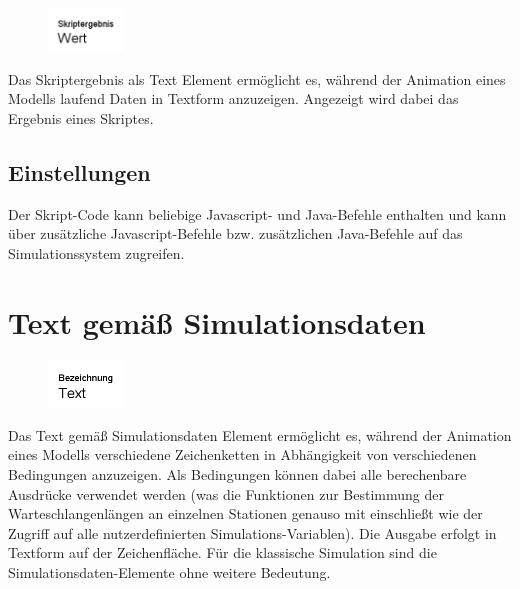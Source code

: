 \begin{figure}
\vspace{-22pt}
\includegraphics[width=2cm]{imageModelElementAnimationTextJS.png}
\vspace{-22pt}
\end{figure}

Das Skriptergebnis als Text Element ermöglicht es, während der Animation eines Modells laufend Daten in Textform anzuzeigen.
Angezeigt wird dabei das Ergebnis eines Skriptes.

\subsection*{Einstellungen}

Der Skript-Code kann beliebige Javascript- und Java-Befehle enthalten und kann über
zusätzliche Javascript-Befehle bzw. zusätzlichen Java-Befehle 
auf das Simulationssystem zugreifen.


\section{Text gemäß Simulationsdaten}
\label{ref:ModelElementAnimationTextSelect}

\begin{figure}
\vspace{-22pt}
\includegraphics[width=2cm]{imageModelElementAnimationTextSelect.png}
\vspace{-22pt}
\end{figure}

Das Text gemäß Simulationsdaten Element ermöglicht es, während der Animation eines Modells verschiedene
Zeichenketten in Abhängigkeit von verschiedenen Bedingungen anzuzeigen. Als Bedingungen können dabei
alle berechenbare Ausdrücke verwendet werden (was die Funktionen zur Bestimmung der Warteschlangenlängen
an einzelnen Stationen genauso mit einschließt wie der Zugriff auf alle nutzerdefinierten Simulations-Variablen).
Die Ausgabe erfolgt in Textform auf der Zeichenfläche. Für die klassische Simulation sind die Simulationsdaten-Elemente
ohne weitere Bedeutung.

